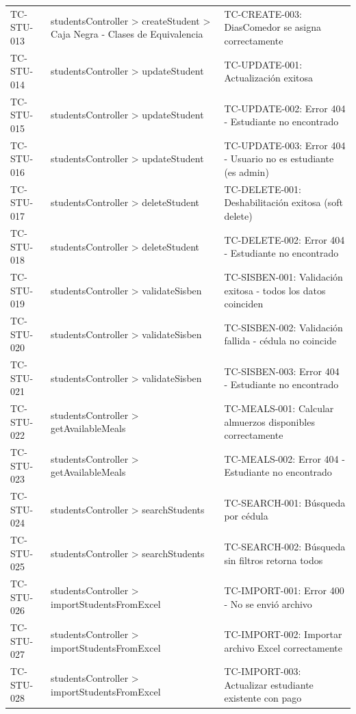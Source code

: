\begin{longtable}{l L{0.30\textwidth} L{0.40\textwidth}}
TC-STU-013 & studentsController > createStudent > Caja Negra - Clases de Equivalencia & TC-CREATE-003: DiasComedor se asigna correctamente \\
TC-STU-014 & studentsController > updateStudent & TC-UPDATE-001: Actualización exitosa \\
TC-STU-015 & studentsController > updateStudent & TC-UPDATE-002: Error 404 - Estudiante no encontrado \\
TC-STU-016 & studentsController > updateStudent & TC-UPDATE-003: Error 404 - Usuario no es estudiante (es admin) \\
TC-STU-017 & studentsController > deleteStudent & TC-DELETE-001: Deshabilitación exitosa (soft delete) \\
TC-STU-018 & studentsController > deleteStudent & TC-DELETE-002: Error 404 - Estudiante no encontrado \\
TC-STU-019 & studentsController > validateSisben & TC-SISBEN-001: Validación exitosa - todos los datos coinciden \\
TC-STU-020 & studentsController > validateSisben & TC-SISBEN-002: Validación fallida - cédula no coincide \\
TC-STU-021 & studentsController > validateSisben & TC-SISBEN-003: Error 404 - Estudiante no encontrado \\
TC-STU-022 & studentsController > getAvailableMeals & TC-MEALS-001: Calcular almuerzos disponibles correctamente \\
TC-STU-023 & studentsController > getAvailableMeals & TC-MEALS-002: Error 404 - Estudiante no encontrado \\
TC-STU-024 & studentsController > searchStudents & TC-SEARCH-001: Búsqueda por cédula \\
TC-STU-025 & studentsController > searchStudents & TC-SEARCH-002: Búsqueda sin filtros retorna todos \\
TC-STU-026 & studentsController > importStudentsFromExcel & TC-IMPORT-001: Error 400 - No se envió archivo \\
TC-STU-027 & studentsController > importStudentsFromExcel & TC-IMPORT-002: Importar archivo Excel correctamente \\
TC-STU-028 & studentsController > importStudentsFromExcel & TC-IMPORT-003: Actualizar estudiante existente con pago \\
\end{longtable}

